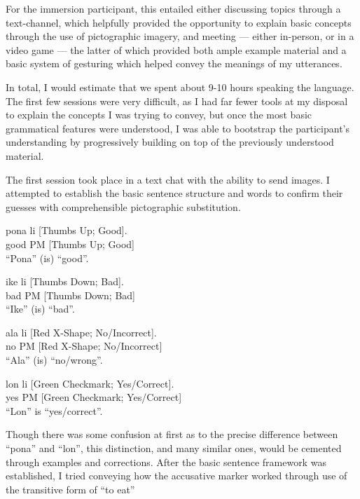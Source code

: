 \documentclass[a4paper,10pt]{article}
\begin{document}
For the immersion participant, this entailed either discussing topics through a text-channel, which
helpfully provided the opportunity to explain basic concepts through the use of pictographic imagery,
and meeting --- either in-person, or in a video game --- the latter of which provided both ample
example material and a basic system of gesturing which helped convey the meanings of my utterances.

In total, I would estimate that we spent about 9-10 hours speaking the language. The first few sessions
were very difficult, as I had far fewer tools at my disposal to explain the concepts I was trying to
convey, but once the most basic grammatical features were understood, I was able to bootstrap the
participant's understanding by progressively building on top of the previously understood material.

The first session took place in a text chat with the ability to send images. I attempted to establish
the basic sentence structure and words to confirm their guesses with comprehensible pictographic
substitution.

\begin{exe}
 \ex
 \gll pona li [Thumbs Up; Good]. \\
 good PM [Thumbs Up; Good] \\
 \glt ``Pona'' (is) ``good''.
\end{exe}
\begin{exe}
 \ex
 \gll ike li [Thumbs Down; Bad]. \\
 bad PM [Thumbs Down; Bad] \\
 \glt ``Ike'' (is) ``bad''.
\end{exe}
\begin{exe}
 \ex
 \gll ala li [Red X-Shape; No/Incorrect]. \\
 no PM [Red X-Shape; No/Incorrect] \\
 \glt ``Ala'' (is) ``no/wrong''.
\end{exe}
\begin{exe}
 \ex
 \gll lon li [Green Checkmark; Yes/Correct]. \\
 yes PM [Green Checkmark; Yes/Correct] \\
 \glt ``Lon'' is ``yes/correct''.
\end{exe}

Though there was some confusion at first as to the precise difference between ``pona'' and ``lon'',
this distinction, and many similar ones, would be cemented through examples and corrections. After
the basic sentence framework was established, I tried conveying how the accusative marker worked
through use of the transitive form of ``to eat''
\end{document}
